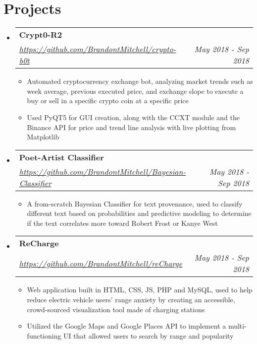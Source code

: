 \documentclass[letterpaper,11pt]{article}
\makeatletter
\newcommand{\resumeItem}[2]{
  \item\small{
    \textbf{#1}{#2 \vspace{-2pt}}
  }
}
\newcommand{\resumeSubheading}[4]{
  \vspace{-1pt}\item
    \begin{tabular*}{0.97\textwidth}{l@{\extracolsep{\fill}}r}
      \textbf{#1} & #2 \\
      \textit{\small#3} & \textit{\small #4} \\
    \end{tabular*}\vspace{-5pt}
}
\newcommand{\resumeSubHeadingListStart}{\begin{itemize}[leftmargin=*]}
\newcommand{\resumeSubHeadingListEnd}{\end{itemize}}
\newcommand{\resumeItemListStart}{\begin{itemize}}
\newcommand{\resumeItemListEnd}{\end{itemize}\vspace{-5pt}}
\makeatother
\begin{document}
\section{Projects}
  \resumeSubHeadingListStart
    \resumeSubheading
      {Crypt0-R2}{}
      {\url{https://github.com/BrandontMitchell/crypto-b0t}}{May 2018 - Sep 2018}
      \resumeItemListStart
        \resumeItem{}
          {Automated cryptocurrency exchange bot, analyzing market trends such as week average, previous executed price, and exchange slope to execute a buy or sell in a specific crypto coin at a specific price}
        \resumeItem{}
          {Used PyQT5 for GUI creation, along with the CCXT module and the Binance API for price and trend line analysis with live plotting from Matplotlib}
      \resumeItemListEnd
      \resumeSubheading
      {Poet-Artist Classifier}{}
      {\url{https://github.com/BrandontMitchell/Bayesian-Classifier}}{May 2018 - Sep 2018}
      \resumeItemListStart
        \resumeItem{}
          {A from-scratch Bayesian Classifier for text provenance, used to classify different text based on probabilities and predictive modeling to determine if the text correlates more toward Robert Frost or Kanye West}
      \resumeItemListEnd
      \resumeSubheading
      {ReCharge}{}
      {\url{https://github.com/BrandontMitchell/reCharge}}{May 2018 - Sep 2018}
      \resumeItemListStart
        \resumeItem{}
          {Web application built in HTML, CSS, JS, PHP and MySQL, used to help reduce electric vehicle users' range anxiety by creating an accessible, crowd-sourced visualization tool made of charging stations}
         \resumeItem{}
            {Utilized the Google Maps and Google Places API to implement a multi-functioning UI that allowed users to search by range and popularity  }
      \resumeItemListEnd
  \resumeSubHeadingListEnd





\end{document}
